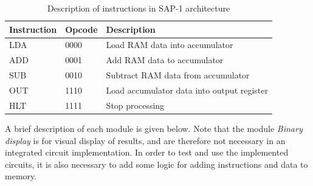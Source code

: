 \begin{table}[hbpt]
    \centering
    \caption{\label{tab:sap1instr}Description of instructions in SAP-1 architecture}
    \begin{tabular}{lll}
      \textbf{Instruction} & \textbf{Opcode} & \textbf{Description} \\
      \toprule
      LDA & 0000 & Load RAM data into accumulator \\
      \hline
      ADD & 0001 & Add RAM data to accumulator \\
      \hline
      SUB & 0010 & Subtract RAM data from accumulator \\
      \hline
      OUT & 1110 & Load accumulator data into output register \\
      \hline
      HLT & 1111 & Stop processing\\
      \bottomrule
    \end{tabular}
\end{table}
\noindent
A brief description of each module is given below. Note that the module \textit{Binary display} is for visual display of results, and are therefore not necessary in an integrated circuit implementation. In order to test and use the implemented circuits, it is also necessary to add some logic for adding instructions and data to memory.


